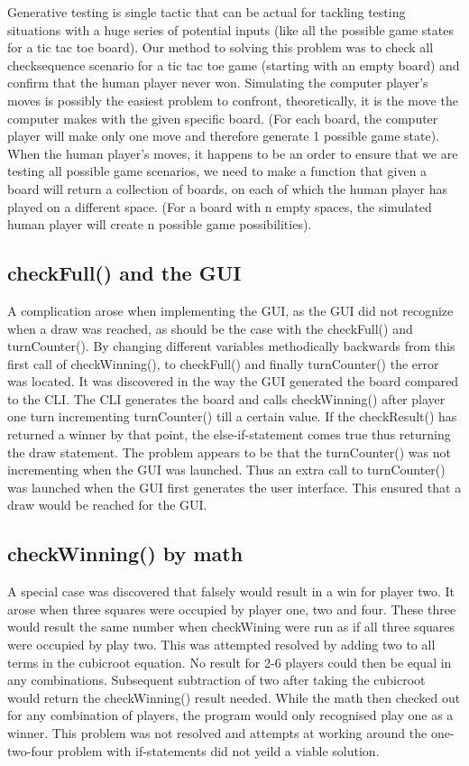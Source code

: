\documentclass[a4paper,10pt]{article}
\begin{document}
	Generative testing is single tactic that can be actual for tackling testing situations with a huge series of potential inputs (like all the possible game states for a tic tac toe board).
	Our method to solving this problem was to check all checksequence scenario for a tic tac toe game (starting with an empty board) and confirm that the human player never won.
	Simulating the computer player’s moves is possibly the easiest problem to confront, theoretically, it is the move the computer makes with the given specific board. (For each board, the computer player will make only one move and therefore generate 1 possible game state).
	When the human player’s moves, it happens to be an order to ensure that we are testing all possible game scenarios, we need to make a function that given a board will return a collection of boards, on each of which the human player has played on a different space. (For a board with n empty spaces, the simulated human player will create n possible game possibilities).
	
	\subsection{checkFull() and the GUI}
	A complication arose when implementing the GUI, as the GUI did not recognize when a draw was reached, as should be the case with the checkFull() and turnCounter(). By changing different variables methodically backwards from this first call of checkWinning(), to checkFull() and finally turnCounter() the error was located. It was discovered in the way the GUI generated the board compared to the CLI.  The CLI generates the board and calls checkWinning() after player one turn incrementing turnCounter() till a certain value. If the checkResult() has returned a winner by that point, the else-if-statement comes true thus returning the draw statement.  
	The problem appears to be that the turnCounter() was not incrementing when the GUI was launched. Thus an extra call to turnCounter() was launched when the GUI first generates the user interface. This ensured that a draw would be reached for the GUI.
	
	\subsection{checkWinning() by math}
	A special case was discovered that falsely would result in a win for player two. It arose when three squares were occupied by player one, two and four. These three would result the same number when checkWining were run as if all three squares were occupied by play two.
	This was attempted resolved by adding two to all terms in the cubicroot equation. No result for 2-6 players could then be equal in any combinations. Subsequent subtraction of two after taking the cubicroot would return the checkWinning() result needed. While the math then checked out for any combination of players, the program would only recognised play one as a winner. This problem was not resolved and attempts at working around the one-two-four problem with if-statements did not yeild a viable solution.  
	
\end{document}
